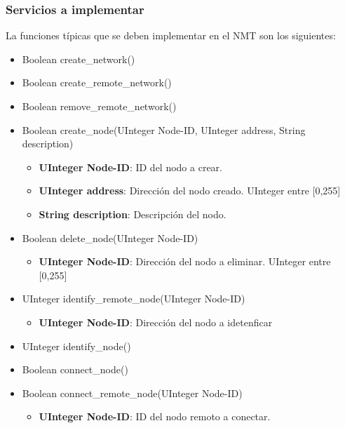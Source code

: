 \subsubsection{Servicios a implementar}
La funciones típicas que se deben implementar en el NMT son los siguientes:
\begin{itemize}
\item Boolean create\_network()
\item Boolean create\_remote\_network() 
\item Boolean remove\_remote\_network()
\item Boolean create\_node(UInteger Node-ID, UInteger address, String description)
  \begin{itemize}
  \item \textbf{UInteger Node-ID}: ID del nodo a crear.
  \item \textbf{UInteger address}: Dirección del nodo creado. UInteger entre [0,255]
  \item \textbf{String description}: Descripción del nodo.
  \end{itemize}
\item Boolean delete\_node(UInteger Node-ID)
  \begin{itemize}
   \item \textbf{UInteger Node-ID}: Dirección del nodo a eliminar. UInteger entre [0,255]
  \end{itemize}
    
\item UInteger identify\_remote\_node(UInteger Node-ID)
  \begin{itemize}
  \item \textbf{UInteger Node-ID}: Dirección del nodo a idetenficar
  \end{itemize}

\item UInteger identify\_node()
  
\item Boolean connect\_node()
  
\item Boolean connect\_remote\_node(UInteger Node-ID)
  \begin{itemize}
    \item \textbf{UInteger Node-ID}: ID del nodo remoto a conectar.
  \end{itemize}


\end{itemize}
